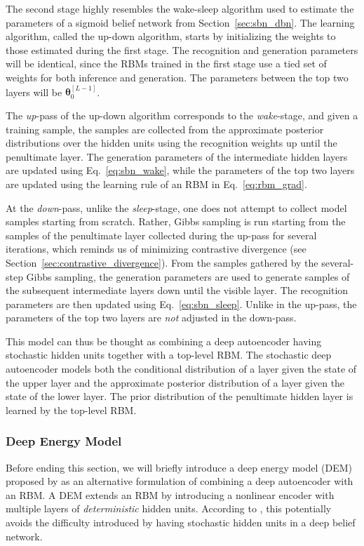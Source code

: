 \documentclass{now}
\newcommand{\qlay}[1]{\left[#1\right]}
\newcommand{\vects}[1]{\boldsymbol{#1}}
\newcommand{\TT}[0]{{\vects{\theta}}}
\begin{document}
The second stage highly resembles the wake-sleep algorithm
used to estimate the parameters of a sigmoid belief network
from Section~\ref{sec:sbn_dbn}. The learning algorithm,
called the up-down algorithm, starts by initializing the
weights to those estimated during the first stage. The
recognition and generation parameters will be identical,
since the RBMs trained in the first stage use a tied set of
weights for both inference and generation. The parameters
between the top two layers will be $\TT_0^{\qlay{L-1}}$.

The \textit{up}-pass of the up-down algorithm corresponds to
the \textit{wake}-stage, and given a training sample, the
samples are collected from the approximate posterior
distributions over the hidden units using the recognition
weights up until the penultimate layer. The generation
parameters of the intermediate hidden layers are updated
using Eq.~\eqref{eq:sbn_wake}, while the parameters of the
top two layers are updated using the learning rule of an RBM
in Eq.~\eqref{eq:rbm_grad}.

At the \textit{down}-pass, unlike the \textit{sleep}-stage,
one does not attempt to collect model samples starting from
scratch. Rather, Gibbs sampling is run starting from the
samples of the penultimate layer collected during the
up-pass for several iterations, which reminds us of
minimizing contrastive divergence (see
Section~\ref{sec:contrastive_divergence}). From the samples
gathered by the several-step Gibbs sampling, the generation
parameters are used to generate samples of the subsequent
intermediate layers down until the visible layer. The
recognition parameters are then updated using
Eq.~\eqref{eq:sbn_sleep}. Unlike in the up-pass, the
parameters of the top two layers are \textit{not} adjusted
in the down-pass.

This model can thus be thought as combining a deep
autoencoder having stochastic hidden units together with a
top-level RBM. The stochastic deep autoencoder models both
the conditional distribution of a layer given the state of
the upper layer and the approximate posterior distribution
of a layer given the state of the lower layer. The prior
distribution of the penultimate hidden layer is learned by
the top-level RBM.

\subsubsection{Deep Energy Model}

Before ending this section, we will briefly introduce a deep
energy model (DEM)
proposed by \citet{Ngiam2011} as an alternative formulation
of combining a deep autoencoder with an RBM. A DEM extends
an RBM by introducing a nonlinear encoder with multiple
layers of \textit{deterministic} hidden units. According to
\citet{Ngiam2011}, this potentially avoids the difficulty
introduced by having stochastic hidden units in a deep
belief network.
\end{document}
